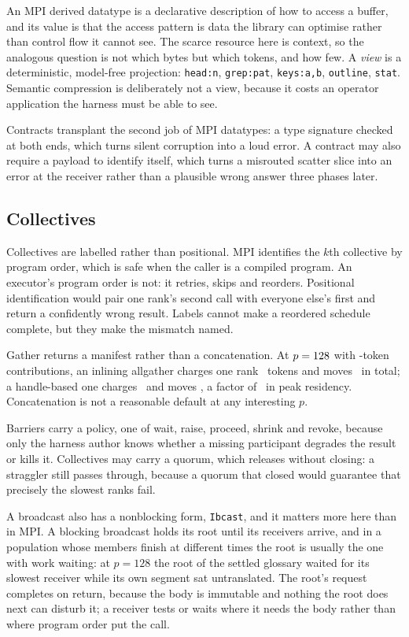 \documentclass[sigconf,nonacm]{acmart}
\newcommand{\code}[1]{\texttt{\small #1}}
\begin{document}
An MPI derived datatype is a declarative description of how to access a buffer,
and its value is that the access pattern is data the library can optimise rather
than control flow it cannot see. The scarce resource here is context, so the
analogous question is not which bytes but which tokens, and how few. A
\emph{view} is a deterministic, model-free projection: \code{head:n},
\code{grep:pat}, \code{keys:a,b}, \code{outline}, \code{stat}. Semantic
compression is deliberately not a view, because it costs an operator application
the harness must be able to see.

Contracts transplant the second job of MPI datatypes: a type signature checked at
both ends, which turns silent corruption into a loud error. A contract may also
require a payload to identify itself, which turns a misrouted scatter slice into
an error at the receiver rather than a plausible wrong answer three phases later.

\subsection{Collectives}
\label{sec:coll}

Collectives are labelled rather than positional. MPI identifies the $k$th
collective by program order, which is safe when the caller is a compiled program.
An executor's program order is not: it retries, skips and reorders. Positional
identification would pair one rank's second call with everyone else's first and
return a confidently wrong result. Labels cannot make a reordered schedule
complete, but they make the mismatch named.

Gather returns a manifest rather than a concatenation. At $p=128$ with
\ctxN-token contributions, an inlining allgather charges one rank
\agInlinePeak\ tokens and moves \agInlineTotal\ in total; a handle-based one
charges \agHandlePeak\ and moves \agHandleTotal, a factor of \agPeakRatio\ in
peak residency. Concatenation is not a reasonable default at any interesting $p$.

Barriers carry a policy, one of wait, raise, proceed, shrink and revoke, because
only the harness author knows whether a missing participant degrades the result
or kills it. Collectives may carry a quorum, which releases without closing: a
straggler still passes through, because a quorum that closed would guarantee
that precisely the slowest ranks fail.

A broadcast also has a nonblocking form, \code{Ibcast}, and it matters more here
than in MPI. A blocking broadcast holds its root until its receivers arrive, and
in a population whose members finish at different times the root is usually the
one with work waiting: at $p=128$ the root of the settled glossary waited for its
slowest receiver while its own segment sat untranslated. The root's request
completes on return, because the body is immutable and nothing the root does next
can disturb it; a receiver tests or waits where it needs the body rather than
where program order put the call.
\end{document}
